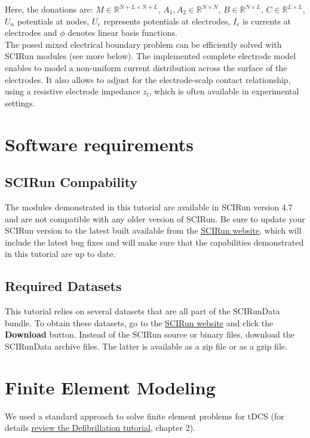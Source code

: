 \documentclass[fleqn,11pt,openany]{book}
\begin{document}
Here, the donations are: $M \in \mathbb{R}^{N+L \times N+L}$, $A_{1},A_{2} \in \mathbb{R}^{N \times N}$, $B \in \mathbb{R}^{N \times L}$, $C \in \mathbb{R}^{L \times L}$, $U_n$ potentials at nodes, $U_e$ represents potentials at electrodes, $I_{e}$ is currents at electrodes and $\phi$ denotes linear basis functions. \\

The posed mixed electrical boundary problem can be efficiently solved with SCIRun modules (see more below).
The implemented complete electrode model enables to model a non-uniform current distribution across the surface of the electrodes. It also allows to 
adjust for the electrode-scalp contact relationship, using a resistive electrode impedance $z_{l}$, which is often available in experimental settings.

\chapter{Software requirements}

\section*{SCIRun Compability} 

The modules demonstrated in this tutorial are available in SCIRun version 4.7 and are not compatible with any older version of SCIRun.
Be sure to update your SCIRun version to the latest built available from the \href{http://www.scirun.org}{SCIRun website}, which will include the latest bug fixes and will make sure that the capabilities demonstrated in this tutorial are up to date.

\section*{Required Datasets} 

This tutorial relies on several datasets that are all part of the SCIRunData bundle.
To obtain these datasets, go to the \href{http://www.scirun.org}{SCIRun website} and click the \textbf{Download} button.
Instead of the SCIRun source or binary files, download the SCIRunData archive files.
The latter is available as a zip file or as a gzip file. 

\chapter{Finite Element Modeling}

We used a standard approach to solve finite element problems for tDCS (for details
\href{http://www.sci.utah.edu/devbuilds/scirun_docs/DefibrillationTutorial.pdf}{review the Defibrillation tutorial}, chapter 2).
\end{document}
